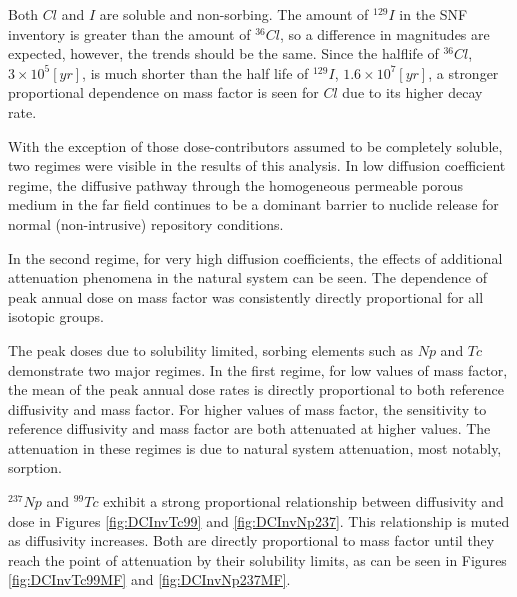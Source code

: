 Both $Cl$ and $I$ are soluble and non-sorbing. The amount of $^{129}I$ in the 
\gls{SNF} inventory is greater than the amount of $^{36}Cl$, so a difference in 
magnitudes are expected, however, the trends should be the same. Since the 
halflife of $^{36}Cl$, $3\times10^5[yr]$, is much shorter than the half life of 
$^{129}I$, $1.6\times10^7[yr]$, a stronger proportional dependence on mass 
factor is seen for $Cl$ due to its higher decay rate. 

With the exception of those dose-contributors assumed to be completely soluble, 
two regimes were visible in the results of this analysis. In low diffusion 
coefficient regime, the diffusive pathway through the homogeneous permeable 
porous medium in the far field continues to be a  dominant barrier to nuclide 
release for normal (non-intrusive) repository conditions. 

In the second regime, for very high diffusion coefficients, the effects of 
additional attenuation phenomena in the natural system can be seen.  The 
dependence of peak annual dose on mass factor was consistently directly 
proportional for all isotopic groups.

The peak doses due to solubility limited, sorbing elements such as $Np$ and 
$Tc$ demonstrate two major regimes. In the first regime, for 
low values of mass factor, the mean of the peak annual dose rates is directly 
proportional to both reference diffusivity and mass factor.  For higher values 
of mass factor, the sensitivity to reference diffusivity and mass factor are 
both attenuated at higher values.  The attenuation in these regimes 
is due to natural system attenuation, most notably, sorption.

$^{237}Np$ and $^{99}Tc$ exhibit a strong proportional relationship 
between diffusivity and dose in Figures \ref{fig:DCInvTc99} and 
\ref{fig:DCInvNp237}. This relationship is muted as diffusivity 
increases. Both are directly proportional to mass factor until they reach the 
point of attenuation by their solubility limits, as can be seen in 
Figures \ref{fig:DCInvTc99MF} and \ref{fig:DCInvNp237MF}.

